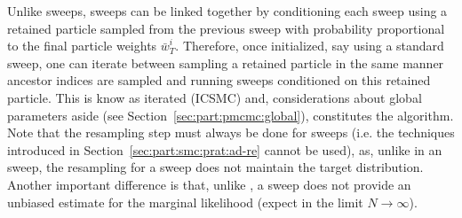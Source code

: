 Unlike \smc sweeps, \csmc sweeps can be linked together by conditioning each sweep using a retained particle
sampled from the previous sweep with probability proportional to the final particle weights $\bar{w}^i_T$.
Therefore, once initialized, say using a standard \smc sweep, one can iterate between sampling a retained
particle in the same manner ancestor indices are sampled and running \csmc sweeps conditioned on this
retained particle.  This is know as iterated \csmc (ICSMC) and, considerations about global parameters 
aside (see Section~\ref{sec:part:pmcmc:global}),  constitutes the \pg algorithm.
Note that the resampling step must always be done for \csmc sweeps (i.e. the techniques introduced in
Section~\ref{sec:part:smc:prat:ad-re} cannot be used), as, unlike in an \smc sweep, the resampling for
a \csmc sweep does not maintain the target distribution.  Another
important difference is that, unlike \smc, a \csmc sweep does not provide an unbiased estimate for the
marginal likelihood (expect in the limit $N\rightarrow\infty$).

